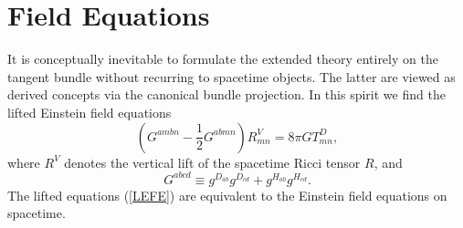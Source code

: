 \documentclass[11pt,a4paper,twoside]{article}
\begin{document}
\section{Field Equations}
It is conceptually inevitable to formulate the extended theory
entirely on the tangent bundle without recurring to spacetime
objects. The latter are viewed as derived concepts via the canonical
bundle projection. In this spirit we find \cite{bik_paper} the lifted Einstein field
equations
\begin{equation}\label{LEFE}
  (G^{ambn} - \frac{1}{2} G^{abmn}) R^V_{mn} = 8 \pi G T^D_{mn},
\end{equation}
where $R^V$ denotes the vertical lift \cite{Yano1973} of the spacetime Ricci tensor
$R$, and
\begin{equation}
  G^{abcd} \equiv g^{D_{ab}} g^{D_{cd}} + g^{H_{ab}}g^{H_{cd}}.
\end{equation}
The lifted equations (\ref{LEFE}) are equivalent to the Einstein field
equations on spacetime.
\end{document}

